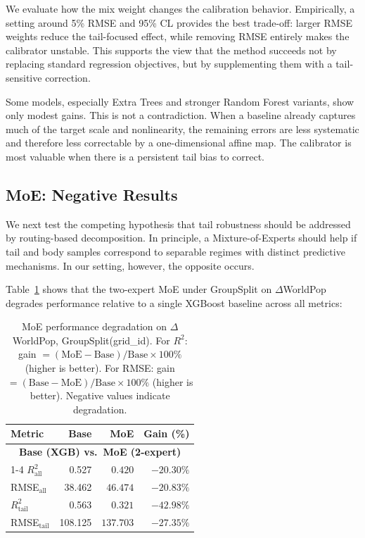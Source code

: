 \documentclass[pdflatex,sn-basic,Numbered]{sn-jnl}
\renewcommand{\arraystretch}{1.1}
\begin{document}
We evaluate how the mix weight changes the calibration behavior. Empirically, a setting around 5\% RMSE and 95\% CL provides the best trade-off: larger RMSE weights reduce the tail-focused effect, while removing RMSE entirely makes the calibrator unstable. This supports the view that the method succeeds not by replacing standard regression objectives, but by supplementing them with a tail-sensitive correction.

Some models, especially Extra Trees and stronger Random Forest variants, show only modest gains. This is not a contradiction. When a baseline already captures much of the target scale and nonlinearity, the remaining errors are less systematic and therefore less correctable by a one-dimensional affine map. The calibrator is most valuable when there is a persistent tail bias to correct.

\subsection{MoE: Negative Results}

We next test the competing hypothesis that tail robustness should be addressed by routing-based decomposition. In principle, a Mixture-of-Experts should help if tail and body samples correspond to separable regimes with distinct predictive mechanisms. In our setting, however, the opposite occurs.

Table~\ref{tab:dwp_gs_moe_drop} shows that the two-expert MoE under GroupSplit on $\Delta$WorldPop degrades performance relative to a single XGBoost baseline across all metrics:

\begin{table}[htbp]
\centering
\small
\setlength{\tabcolsep}{5pt}
\renewcommand{\arraystretch}{1.10}
\caption{MoE performance degradation on $\Delta$WorldPop, GroupSplit(grid\_id). For $R^2$: gain $= (\text{MoE}-\text{Base})/\text{Base} \times 100\%$ (higher is better). For RMSE: gain $= (\text{Base}-\text{MoE})/\text{Base} \times 100\%$ (higher is better). Negative values indicate degradation.}
\label{tab:dwp_gs_moe_drop}
\begin{tabular}{lrrr}
\toprule
\textbf{Metric} & \textbf{Base} & \textbf{MoE} & \textbf{Gain (\%)} \\
\midrule

\multicolumn{4}{c}{\textbf{Base (XGB) vs.\ MoE (2-expert)}} \\
\cmidrule(lr){1-4}
$R^2_{\mathrm{all}}$    & 0.527   & $0.420$  & $-20.30\%$ \\
RMSE$_{\mathrm{all}}$   & 38.462  & $46.474$   & $-20.83\%$ \\
$R^2_{\mathrm{tail}}$   & 0.563   & $0.321$  & $-42.98\%$ \\
RMSE$_{\mathrm{tail}}$  & 108.125 & $137.703$  & $-27.35\%$ \\

\bottomrule
\end{tabular}
\end{table}
\end{document}

